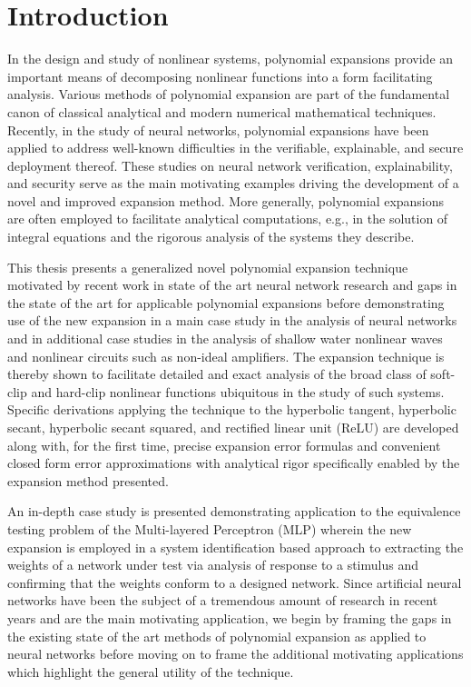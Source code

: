 \chapter{Introduction}

\label{chapter_introduction}

In the design and study of nonlinear systems, polynomial expansions provide an important means of decomposing nonlinear functions into a form facilitating analysis.  Various methods of polynomial expansion are part of the fundamental canon of classical analytical and modern numerical mathematical techniques.  Recently, in the study of neural networks, polynomial expansions have been applied to address well-known difficulties in the verifiable, explainable, and secure deployment thereof.  These studies on neural network verification, explainability, and security serve as the main motivating examples driving the development of a novel and improved expansion method.  More generally, polynomial expansions are often employed to facilitate analytical computations, e.g., in the solution of integral equations and the rigorous analysis of the systems they describe.

This thesis presents a generalized novel polynomial expansion technique motivated by recent work in state of the art neural network research and gaps in the state of the art for applicable polynomial expansions before demonstrating use of the new expansion in a main case study in the analysis of neural networks and in additional case studies in the analysis of shallow water nonlinear waves and nonlinear circuits such as non-ideal amplifiers.  The expansion technique is thereby shown to facilitate detailed and exact analysis of the broad class of soft-clip and hard-clip nonlinear functions ubiquitous in the study of such systems.  Specific derivations applying the technique to the hyperbolic tangent, hyperbolic secant, hyperbolic secant squared, and rectified linear unit (ReLU) are developed along with, for the first time, precise expansion error formulas and convenient closed form error approximations with analytical rigor specifically enabled by the expansion method presented.

An in-depth case study is presented demonstrating application to the equivalence testing problem of the Multi-layered Perceptron (MLP) wherein the new expansion is employed in a system identification based approach to extracting the weights of a network under test via analysis of response to a stimulus and confirming that the weights conform to a designed network.  Since artificial neural networks have been the subject of a tremendous amount of research in recent years and are the main motivating application, we begin by framing the gaps in the existing state of the art methods of polynomial expansion as applied to neural networks before moving on to frame the additional motivating applications which highlight the general utility of the technique.


